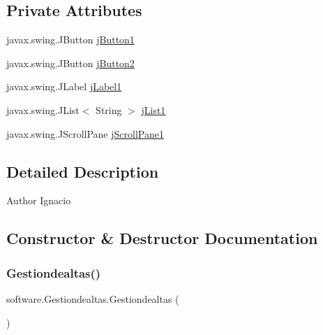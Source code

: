 \subsection*{Private Attributes}
\begin{DoxyCompactItemize}
\item 
javax.\+swing.\+J\+Button \mbox{\hyperlink{classsoftware_1_1_gestiondealtas_ae72c1863bf05ff8d6bf46ebbba12a891}{j\+Button1}}
\item 
javax.\+swing.\+J\+Button \mbox{\hyperlink{classsoftware_1_1_gestiondealtas_ac9d4185d1fb15805001c5adb3dd68576}{j\+Button2}}
\item 
javax.\+swing.\+J\+Label \mbox{\hyperlink{classsoftware_1_1_gestiondealtas_a0ef50908d3fbffb4f2704062e57ee873}{j\+Label1}}
\item 
javax.\+swing.\+J\+List$<$ String $>$ \mbox{\hyperlink{classsoftware_1_1_gestiondealtas_ac1e9b172368b6ae85174bceb13935256}{j\+List1}}
\item 
javax.\+swing.\+J\+Scroll\+Pane \mbox{\hyperlink{classsoftware_1_1_gestiondealtas_aaae4daa1d692c7fbf9d53666e54cee13}{j\+Scroll\+Pane1}}
\end{DoxyCompactItemize}


\subsection{Detailed Description}
\begin{DoxyAuthor}{Author}
Ignacio 
\end{DoxyAuthor}


\subsection{Constructor \& Destructor Documentation}
\mbox{\label{classsoftware_1_1_gestiondealtas_a00ba9520dbcc70ceaf94eccc527ea915}} 
\subsubsection{\texorpdfstring{Gestiondealtas()}{Gestiondealtas()}}
{\footnotesize\ttfamily software.\+Gestiondealtas.\+Gestiondealtas (\begin{DoxyParamCaption}{ }\end{DoxyParamCaption})\hspace{0.3cm}{\ttfamily [inline]}}

